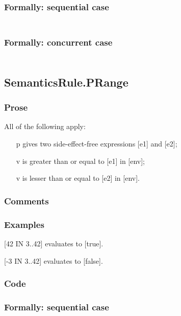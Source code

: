 \documentclass{book}
\begin{document}
  \subsubsection{Formally: sequential case}
  \begin{align}
  \end{align} 

  \subsubsection{Formally: concurrent case}
  \begin{align}
  \end{align} 

\subsection{SemanticsRule.PRange \label{sec:SemanticsRule.PRange}}

    \subsubsection{Prose}
    All of the following apply:
    \begin{itemize}
    \item [p] gives two side-effect-free expressions [e1] and [e2];
    \item [v] is greater than or equal to [e1] in [env];
    \item [v] is lesser than or equal to [e2] in [env].
    \end{itemize}

    \subsubsection{Comments}

    \subsubsection{Examples}
    [42 IN {3..42}] evaluates to [true].

    [-3 IN {3..42}] evaluates to [false].

  \subsubsection{Code}

  \subsubsection{Formally: sequential case}
  \begin{align}
  \end{align} 
\end{document}
